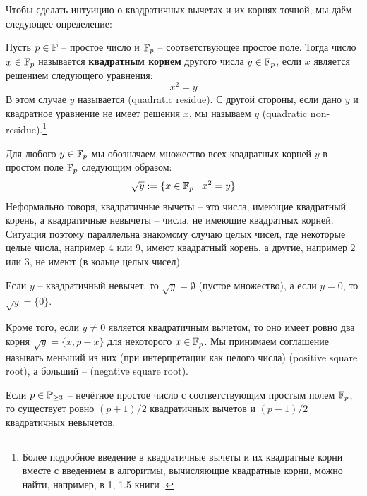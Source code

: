 Чтобы сделать интуицию о квадратичных вычетах и их корнях точной, мы даём следующее определение:

\begin{definition}
 Пусть $p \in \mathbb{P} $ -- простое число и $\mathbb{F}_p $ -- соответствующее простое поле. Тогда число $x\in \mathbb{F}_p$ называется \textbf{квадратным корнем} другого числа $y\in\mathbb{F}_p$, если $x$ является решением следующего уравнения:
\begin{equation}
x^2 = y
\end{equation}
В этом случае $y$ называется  (quadratic residue). С другой стороны, если дано $y$ и квадратное уравнение не имеет решения $x$, мы называем $ y $  (quadratic non-residue).\footnote{Более подробное введение в квадратичные вычеты и их квадратные корни вместе с введением в алгоритмы, вычисляющие квадратные корни, можно найти, например, в \chaptname{} 1, \secname{} 1.5 книги \cite{cohen-2010}.}
\end{definition}

Для любого $ y \in \mathbb{F}_p $ мы обозначаем множество всех квадратных корней $ y $ в простом поле $ \mathbb{F}_p $ следующим образом:
\begin{equation}
\label{ded:square_root}
\sqrt{y}: = \{x \in \mathbb{F}_p \; | \; x^2 = y \}
\end{equation}
Неформально говоря, квадратичные вычеты -- это числа, имеющие квадратный корень, а квадратичные невычеты -- числа, не имеющие квадратных корней. Ситуация поэтому параллельна знакомому случаю целых чисел, где некоторые целые числа, например $4$ или $9$, имеют квадратный корень, а другие, например $2$ или $3$, не имеют (в кольце целых чисел).

Если $ y $ -- квадратичный невычет, то $ \sqrt{y} = \emptyset $ (пустое множество), а если $ y = 0 $, то $ \sqrt{y} = \{0 \} $.

Кроме того, если $y\neq 0$ является квадратичным вычетом, то оно имеет ровно два корня $\sqrt{y}=\{x,p-x\}$ для некоторого $x\in \mathbb{F}_p$. Мы принимаем соглашение называть меньший из них (при интерпретации как целого числа)  (positive square root), а больший --  (negative square root).

Если $ p \in \mathbb{P}_{\geq 3} $ -- нечётное простое число с соответствующим простым полем $\mathbb{F}_p$, то существует ровно $(p+1)/2$ квадратичных вычетов и $(p-1)/2$ квадратичных невычетов.

